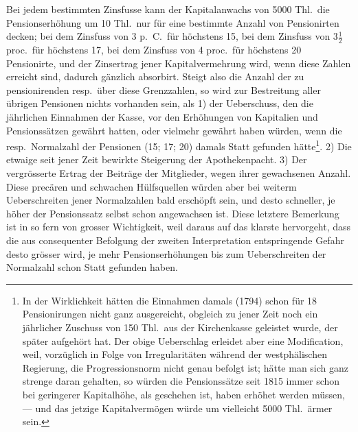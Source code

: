 \documentclass[12pt,a4paper]{article}
\begin{document}
Bei jedem bestimmten Zinsfusse kann der Kapitalanwachs von 5000 Thl.\ die Pensionserh\"ohung um 10 Thl.\ nur f\"ur eine bestimmte Anzahl von Pensionirten decken; bei dem Zinsfuss von 3 p.\ C.\ f\"ur h\"ochstens 15, bei dem Zinsfuss von $3\frac{1}{2}$ proc.\ f\"ur h\"ochstens 17, bei dem Zinsfuss von 4 proc.\ f\"ur h\"ochstens 20 Pensionirte, und der Zinsertrag jener Kapitalvermehrung wird, wenn diese Zahlen erreicht sind, dadurch g\"anzlich absorbirt. Steigt also die Anzahl der zu pensionirenden resp.\ \"uber diese Grenzzahlen, so wird zur Bestreitung aller \"ubrigen Pensionen nichts vorhanden sein, als 1) der Ueberschuss, den die j\"ahrlichen Einnahmen der Kasse, vor den Erh\"ohungen von Kapitalien und Pensionss\"atzen gew\"ahrt hatten, oder vielmehr gew\"ahrt haben w\"urden, wenn die resp.\ Normalzahl der Pensionen (15; 17; 20) damals Statt gefunden h\"atte\footnote{In der Wirklichkeit h\"atten die Einnahmen damals (1794) schon f\"ur 18 Pensionirungen nicht ganz ausgereicht, obgleich zu jener Zeit noch ein j\"ahrlicher Zuschuss von 150 Thl.\ aus der Kirchenkasse geleistet wurde, der sp\"ater aufgeh\"ort hat. Der obige Ueberschlag erleidet aber eine Modification, weil, vorz\"uglich in Folge von Irregularit\"aten w\"ahrend der westph\"alischen Regierung, die Progressionsnorm nicht genau befolgt ist; h\"atte man sich ganz strenge daran gehalten, so w\"urden die Pensionss\"atze seit 1815 immer schon bei geringerer Kapitalh\"ohe, als geschehen ist, haben erh\"ohet werden m\"ussen, --- und das jetzige Kapitalverm\"ogen w\"urde um vielleicht 5000 Thl.\ \"armer sein.}. 2) Die etwaige seit jener Zeit bewirkte Steigerung der Apothekenpacht. 3) Der vergr\"osserte Ertrag der Beitr\"age der Mitglieder, wegen ihrer gewachsenen Anzahl. Diese prec\"aren und schwachen H\"ulfsquellen w\"urden aber bei weiterm Ueberschreiten jener Normalzahlen bald ersch\"opft sein, und desto schneller, je h\"oher der Pensionssatz selbst schon angewachsen ist. Diese letztere Bemerkung ist in so fern von grosser Wichtigkeit, weil daraus auf das klarste hervorgeht, dass die aus consequenter Befolgung der zweiten Interpretation entspringende Gefahr desto gr\"osser wird, je mehr Pensionserh\"ohungen bis zum Ueberschreiten der Normalzahl schon Statt gefunden haben.
\end{document}
